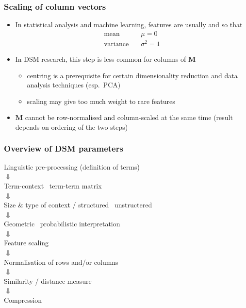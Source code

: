 \begin{frame}
  \frametitle{Scaling of column vectors}

  \begin{itemize}
  \item In statistical analysis and machine learning, features are
    usually  and  so that
    \begin{align*}
      \text{mean} & \quad \mu = 0 \\
      \text{variance} & \quad \sigma^2 = 1
    \end{align*}
  \item In DSM research, this step is less common for columns of $\mathbf{M}$
    \begin{itemize}
    \item centring is a prerequisite for certain dimensionality
      reduction and data analysis techniques (esp.\ PCA)
    \item scaling may give too much weight to rare features
    \end{itemize}
    \pause
  \item $\mathbf{M}$ cannot be row-normalised and column-scaled at the
    same time (result depends on ordering of the two steps)
  \end{itemize}
\end{frame}

\begin{frame}
  \frametitle{Overview of DSM parameters}

  \ungap[1]
  \begin{center}
    Linguistic pre-processing (definition of terms)\\
    $\Downarrow$\\
    Term-context \vs\ term-term matrix\\
    $\Downarrow$\\
    Size \& type of context / structured \vs\ unstructered\\
    $\Downarrow$\\
    Geometric \vs\ probabilistic interpretation\\
    $\Downarrow$\\
    Feature scaling\\
    $\Downarrow$\\
    Normalisation of rows and/or columns\\
    $\Downarrow$\\
    \h{Similarity / distance measure}\\
    $\Downarrow$\\
    Compression
  \end{center}
\end{frame}

